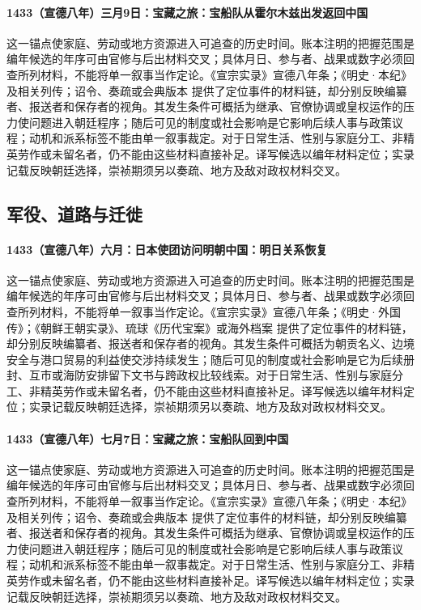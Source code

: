\paragraph{1433（宣德八年）三月9日：宝藏之旅：宝船队从霍尔木兹出发返回中国} 这一锚点使家庭、劳动或地方资源进入可追查的历史时间。账本注明的把握范围是编年候选的年序可由官修与后出材料交叉；具体月日、参与者、战果或数字必须回查所列材料，不能将单一叙事当作定论。《宣宗实录》宣德八年条；《明史·本纪》及相关列传；诏令、奏疏或会典版本 提供了定位事件的材料链，却分别反映编纂者、报送者和保存者的视角。其发生条件可概括为继承、官僚协调或皇权运作的压力使问题进入朝廷程序；随后可见的制度或社会影响是它影响后续人事与政策议程；动机和派系标签不能由单一叙事裁定。对于日常生活、性别与家庭分工、非精英劳作或未留名者，仍不能由这些材料直接补足。译写候选以编年材料定位；实录记载反映朝廷选择，崇祯期须另以奏疏、地方及敌对政权材料交叉。

\subsection{军役、道路与迁徙}

\paragraph{1433（宣德八年）六月：日本使团访问明朝中国：明日关系恢复} 这一锚点使家庭、劳动或地方资源进入可追查的历史时间。账本注明的把握范围是编年候选的年序可由官修与后出材料交叉；具体月日、参与者、战果或数字必须回查所列材料，不能将单一叙事当作定论。《宣宗实录》宣德八年条；《明史·外国传》；《朝鲜王朝实录》、琉球《历代宝案》或海外档案 提供了定位事件的材料链，却分别反映编纂者、报送者和保存者的视角。其发生条件可概括为朝贡名义、边境安全与港口贸易的利益使交涉持续发生；随后可见的制度或社会影响是它为后续册封、互市或海防安排留下文书与跨政权比较线索。对于日常生活、性别与家庭分工、非精英劳作或未留名者，仍不能由这些材料直接补足。译写候选以编年材料定位；实录记载反映朝廷选择，崇祯期须另以奏疏、地方及敌对政权材料交叉。

\paragraph{1433（宣德八年）七月7日：宝藏之旅：宝船队回到中国} 这一锚点使家庭、劳动或地方资源进入可追查的历史时间。账本注明的把握范围是编年候选的年序可由官修与后出材料交叉；具体月日、参与者、战果或数字必须回查所列材料，不能将单一叙事当作定论。《宣宗实录》宣德八年条；《明史·本纪》及相关列传；诏令、奏疏或会典版本 提供了定位事件的材料链，却分别反映编纂者、报送者和保存者的视角。其发生条件可概括为继承、官僚协调或皇权运作的压力使问题进入朝廷程序；随后可见的制度或社会影响是它影响后续人事与政策议程；动机和派系标签不能由单一叙事裁定。对于日常生活、性别与家庭分工、非精英劳作或未留名者，仍不能由这些材料直接补足。译写候选以编年材料定位；实录记载反映朝廷选择，崇祯期须另以奏疏、地方及敌对政权材料交叉。


